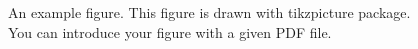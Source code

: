 \begin{figure}[t]
    \centering
    \caption[An example figure.]{An example figure. This figure is drawn with tikzpicture package. You can introduce your figure with a given PDF file.}
    \label{fig.chapter1.example_figure}
\end{figure}